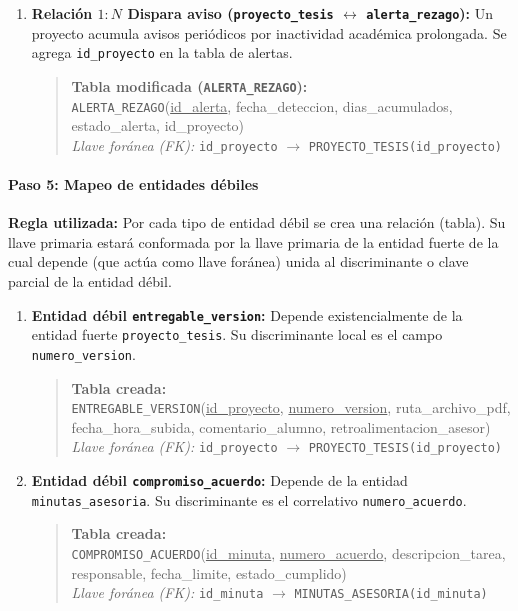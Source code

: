 \begin{enumerate}
    \item \textbf{Relación $1:N$ Dispara aviso (\texttt{proyecto\_tesis} $\leftrightarrow$ \texttt{alerta\_rezago}):} Un proyecto acumula avisos periódicos por inactividad académica prolongada. Se agrega \texttt{id\_proyecto} en la tabla de alertas.
    \begin{quote}
        \textbf{Tabla modificada (\texttt{ALERTA\_REZAGO}):} \\
        \texttt{ALERTA\_REZAGO}(\underline{id\_alerta}, fecha\_deteccion, dias\_acumulados, estado\_alerta, id\_proyecto) \\
        \textit{Llave foránea (FK):} \texttt{id\_proyecto} $\rightarrow$ \texttt{PROYECTO\_TESIS(id\_proyecto)}
    \end{quote}
\end{enumerate}

\paragraph{Paso 5: Mapeo de entidades débiles}
\textbf{Regla utilizada:} Por cada tipo de entidad débil se crea una relación (tabla). Su llave primaria estará conformada por la llave primaria de la entidad fuerte de la cual depende (que actúa como llave foránea) unida al discriminante o clave parcial de la entidad débil.

\begin{enumerate}
    \item \textbf{Entidad débil \texttt{entregable\_version}:} Depende existencialmente de la entidad fuerte \texttt{proyecto\_tesis}. Su discriminante local es el campo \texttt{numero\_version}.
    \begin{quote}
        \textbf{Tabla creada:} \\
        \texttt{ENTREGABLE\_VERSION}(\underline{id\_proyecto}, \underline{numero\_version}, ruta\_archivo\_pdf, fecha\_hora\_subida, comentario\_alumno, retroalimentacion\_asesor) \\
        \textit{Llave foránea (FK):} \texttt{id\_proyecto} $\rightarrow$ \texttt{PROYECTO\_TESIS(id\_proyecto)}
    \end{quote}

    \item \textbf{Entidad débil \texttt{compromiso\_acuerdo}:} Depende de la entidad \texttt{minutas\_asesoria}. Su discriminante es el correlativo \texttt{numero\_acuerdo}.
    \begin{quote}
        \textbf{Tabla creada:} \\
        \texttt{COMPROMISO\_ACUERDO}(\underline{id\_minuta}, \underline{numero\_acuerdo}, descripcion\_tarea, responsable, fecha\_limite, estado\_cumplido) \\
        \textit{Llave foránea (FK):} \texttt{id\_minuta} $\rightarrow$ \texttt{MINUTAS\_ASESORIA(id\_minuta)}
    \end{quote}
\end{enumerate}



